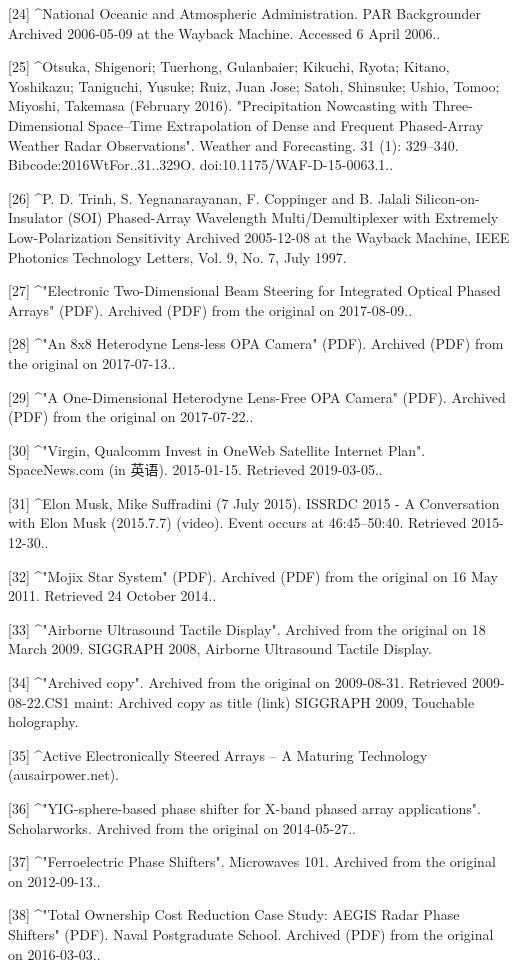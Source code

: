 [24]
^National Oceanic and Atmospheric Administration. PAR Backgrounder Archived 2006-05-09 at the Wayback Machine. Accessed 6 April 2006..

[25]
^Otsuka, Shigenori; Tuerhong, Gulanbaier; Kikuchi, Ryota; Kitano, Yoshikazu; Taniguchi, Yusuke; Ruiz, Juan Jose; Satoh, Shinsuke; Ushio, Tomoo; Miyoshi, Takemasa (February 2016). "Precipitation Nowcasting with Three-Dimensional Space–Time Extrapolation of Dense and Frequent Phased-Array Weather Radar Observations". Weather and Forecasting. 31 (1): 329–340. Bibcode:2016WtFor..31..329O. doi:10.1175/WAF-D-15-0063.1..

[26]
^P. D. Trinh, S. Yegnanarayanan, F. Coppinger and B. Jalali Silicon-on-Insulator (SOI) Phased-Array Wavelength Multi/Demultiplexer with Extremely Low-Polarization Sensitivity Archived 2005-12-08 at the Wayback Machine, IEEE Photonics Technology Letters, Vol. 9, No. 7, July 1997.

[27]
^"Electronic Two-Dimensional Beam Steering for Integrated Optical Phased Arrays" (PDF). Archived (PDF) from the original on 2017-08-09..

[28]
^"An 8x8 Heterodyne Lens-less OPA Camera" (PDF). Archived (PDF) from the original on 2017-07-13..

[29]
^"A One-Dimensional Heterodyne Lens-Free OPA Camera" (PDF). Archived (PDF) from the original on 2017-07-22..

[30]
^"Virgin, Qualcomm Invest in OneWeb Satellite Internet Plan". SpaceNews.com (in 英语). 2015-01-15. Retrieved 2019-03-05..

[31]
^Elon Musk, Mike Suffradini (7 July 2015). ISSRDC 2015 - A Conversation with Elon Musk (2015.7.7) (video). Event occurs at 46:45–50:40. Retrieved 2015-12-30..

[32]
^"Mojix Star System" (PDF). Archived (PDF) from the original on 16 May 2011. Retrieved 24 October 2014..

[33]
^"Airborne Ultrasound Tactile Display". Archived from the original on 18 March 2009. SIGGRAPH 2008, Airborne Ultrasound Tactile Display.

[34]
^"Archived copy". Archived from the original on 2009-08-31. Retrieved 2009-08-22.CS1 maint: Archived copy as title (link) SIGGRAPH 2009, Touchable holography.

[35]
^Active Electronically Steered Arrays – A Maturing Technology (ausairpower.net).

[36]
^"YIG-sphere-based phase shifter for X-band phased array applications". Scholarworks. Archived from the original on 2014-05-27..

[37]
^"Ferroelectric Phase Shifters". Microwaves 101. Archived from the original on 2012-09-13..

[38]
^"Total Ownership Cost Reduction Case Study: AEGIS Radar Phase Shifters" (PDF). Naval Postgraduate School. Archived (PDF) from the original on 2016-03-03..
